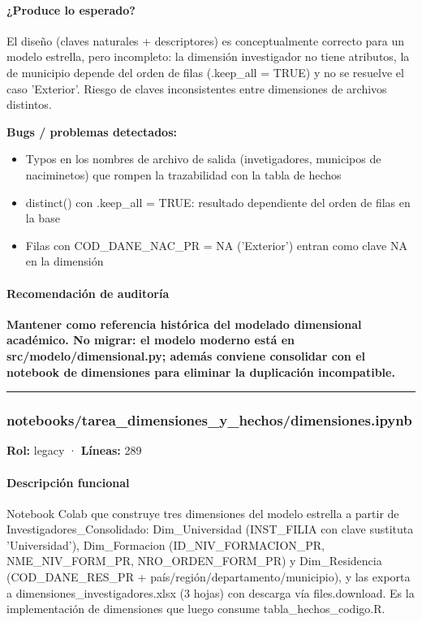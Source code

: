 \paragraph{¿Produce lo esperado?}
El diseño (claves naturales + descriptores) es conceptualmente correcto para un modelo estrella, pero incompleto: la dimensión investigador no tiene atributos, la de municipio depende del orden de filas (.keep\_all = TRUE) y no se resuelve el caso 'Exterior'. Riesgo de claves inconsistentes entre dimensiones de archivos distintos.

\begin{tcolorbox}[riesgo]
\textbf{Bugs / problemas detectados:}
\begin{itemize}
  \item Typos en los nombres de archivo de salida (invetigadores, municipos de naciminetos) que rompen la trazabilidad con la tabla de hechos
  \item distinct() con .keep\_all = TRUE: resultado dependiente del orden de filas en la base
  \item Filas con COD\_DANE\_NAC\_PR = NA ('Exterior') entran como clave NA en la dimensión
\end{itemize}
\end{tcolorbox}

\paragraph{Recomendación de auditoría}
\textbf{Mantener como referencia histórica del modelado dimensional académico. No migrar: el modelo moderno está en src/modelo/dimensional.py; además conviene consolidar con el notebook de dimensiones para eliminar la duplicación incompatible.}

\medskip
\hrule

\subsubsection{notebooks/tarea\_dimensiones\_y\_hechos/dimensiones.ipynb}
\textbf{Rol:} legacy · \textbf{Líneas:} 289

\paragraph{Descripción funcional}
Notebook Colab que construye tres dimensiones del modelo estrella a partir de Investigadores\_Consolidado: Dim\_Universidad (INST\_FILIA con clave sustituta 'Universidad'), Dim\_Formacion (ID\_NIV\_FORMACION\_PR, NME\_NIV\_FORM\_PR, NRO\_ORDEN\_FORM\_PR) y Dim\_Residencia (COD\_DANE\_RES\_PR + país/región/departamento/municipio), y las exporta a dimensiones\_investigadores.xlsx (3 hojas) con descarga vía files.download. Es la implementación de dimensiones que luego consume tabla\_hechos\_codigo.R.

